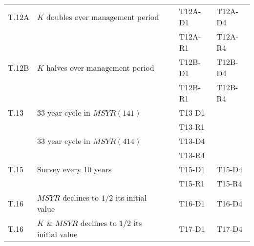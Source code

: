 \begin{table}[ht]
\begin{tabular}{lllll}
  T.12A & $K$ doubles over management period & & T12A-D1 & T12A-D4 \\
        &                                    & & T12A-R1 & T12A-R4 \\
  T.12B & $K$ halves  over management period & & T12B-D1 & T12B-D4 \\
        &                                    & & T12B-R1 & T12B-R4 \\
  T.13  & 33 year cycle in $MSYR (141)$ & & T13-D1 & \\
        &                               & & T13-R1 & \\
        & 33 year cycle in $MSYR (414)$ & & T13-D4 & \\
        &                               & & T13-R4 & \\
  T.15  & Survey every 10 years & & T15-D1 & T15-D4 \\
        &                       & & T15-R1 & T15-R4 \\
  T.16  & $MSYR$ declines to $1/2$ its initial value        & & T16-D1 & T16-D4 \\
  T.16  & $K$ \& $MSYR$ declines to $1/2$ its initial value & & T17-D1 & T17-D4 \\
  \hline
\end{tabular}
\end{table}
